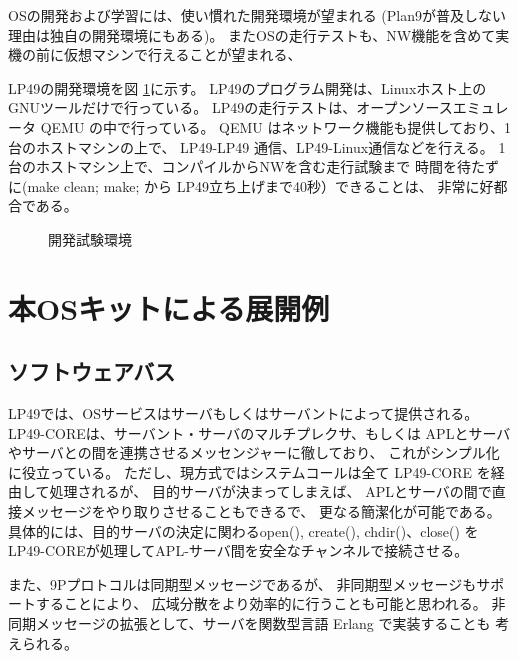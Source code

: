 \documentclass[draft]{ipsjpapers}
\begin{document}
OSの開発および学習には、使い慣れた開発環境が望まれる
(Plan9が普及しない理由は独自の開発環境にもある)。
またOSの走行テストも、NW機能を含めて実機の前に仮想マシンで行えることが望まれる、

LP49の開発環境を図 \ref{fig:SDE}に示す。
LP49のプログラム開発は、Linuxホスト上の GNUツールだけで行っている。
LP49の走行テストは、オープンソースエミュレータ QEMU の中で行っている。
QEMU はネットワーク機能も提供しており、1台のホストマシンの上で、
LP49-LP49 通信、LP49-Linux通信などを行える。
1台のホストマシン上で、コンパイルからNWを含む走行試験まで
時間を待たずに(make clean; make; から LP49立ち上げまで40秒）できることは、
非常に好都合である。


\begin{figure}[htb]
  \begin{center}
   \epsfxsize=360pt
    \caption{開発試験環境}
    \label{fig:SDE}
  \end{center}
\end{figure}


\section{本OSキットによる展開例}

\subsection{ソフトウェアバス}

LP49では、OSサービスはサーバもしくはサーバントによって提供される。
LP49-COREは、サーバント・サーバのマルチプレクサ、もしくは
APLとサーバやサーバとの間を連携させるメッセンジャーに徹しており、
これがシンプル化に役立っている。
ただし、現方式ではシステムコールは全て LP49-CORE を経由して処理されるが、
目的サーバが決まってしまえば、
APLとサーバの間で直接メッセージをやり取りさせることもできるで、
更なる簡潔化が可能である。
具体的には、目的サーバの決定に関わるopen(), create(), chdir()、close() を
LP49-COREが処理してAPL-サーバ間を安全なチャンネルで接続させる。

また、9Pプロトコルは同期型メッセージであるが、
非同期型メッセージもサポートすることにより、
広域分散をより効率的に行うことも可能と思われる。
非同期メッセージの拡張として、サーバを関数型言語 Erlang で実装することも
考えられる。


\begin{comment}
図 \ref{fig:simpleOS}

\begin{figure}[htb]
  \begin{center}
   \epsfxsize=400pt
   \epsfbox{fig/simpleOS.eps}
    \caption{簡明なOS構成}
    \label{fig:simpleOS}
  \end{center}
\end{figure}
\end{comment}
\end{document}
